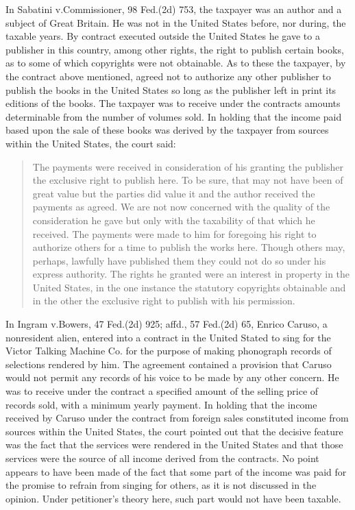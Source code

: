 \begin{select}
In Sabatini v.\@ Commissioner, 98 Fed.(2d) 753, the taxpayer was an author and a subject of Great Britain. He was not in the United States before, nor during, the taxable years. By contract executed outside the United States he gave to a publisher in this country, among other rights, the right to publish certain books, as to some of which copyrights were not obtainable. As to these the taxpayer, by the contract above mentioned, agreed not to authorize any other publisher to publish the books in the United States so long as the publisher left in print its editions of the books. The taxpayer was to receive under the contracts amounts determinable from the number of volumes sold. In holding that the income paid based upon the sale of these books was derived by the taxpayer from sources within the United States, the court said:
\begin{quote}The payments were received in consideration of his granting the publisher the exclusive right to publish here. To be sure, that may not have been of great value but the parties did value it and the author received the payments as agreed. We are not now concerned with the quality of the consideration he gave but only with the taxability of that which he received. The payments were made to him for foregoing his right to authorize others for a time to publish the works here. Though others may, perhaps, lawfully have published them they could not do so under his express authority. The rights he granted were an interest in property in the United States, in the one instance the statutory copyrights obtainable and in the other the exclusive right to publish with his permission.
\end{quote}

In Ingram v.\@ Bowers, 47 Fed.(2d) 925; affd., 57 Fed.(2d) 65, Enrico Caruso, a nonresident alien, entered into a contract in the United Stated to sing for the Victor Talking Machine Co. for the purpose of making phonograph records of selections rendered by him. The agreement contained a provision that Caruso would not permit any records of his voice to be made by any other concern. He was to receive under the contract a specified amount of the selling price of records sold, with a minimum yearly payment. In holding that the income received by Caruso under the contract from foreign sales constituted income from sources within the United States, the court pointed out that the decisive feature was the fact that the services were rendered in the United States and that those services were the source of all income derived from the contracts. No point appears to have been made of the fact that some part of the income was paid for the promise to refrain from singing for others, as it is not discussed in the opinion. Under petitioner's theory here, such part would not have been taxable.


\end{select}
